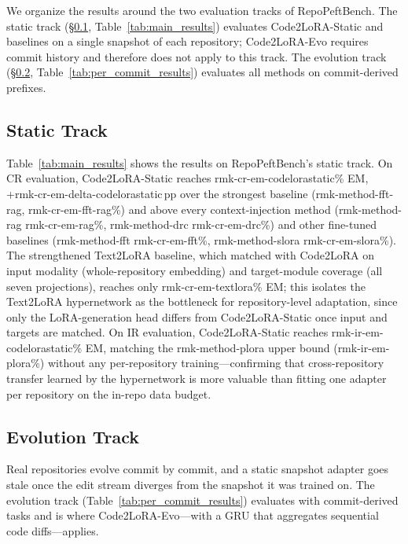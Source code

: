 \documentclass[11pt]{article}
\newcommand{\UseMacro}[1]{\csname rmk-#1\endcsname}
\newcommand{\codelora}{Code2LoRA\xspace}
\newcommand{\repopeftbench}{RepoPeftBench\xspace}
\newcommand{\codelorastatic}{\codelora-Static\xspace}
\newcommand{\codeloraevo}{\codelora-Evo\xspace}
\newcommand{\textlora}{Text2LoRA\xspace}
\begin{document}
We organize the results around the two evaluation tracks of \repopeftbench{}.
The static track (\S\ref{sec:results:static}, Table~\ref{tab:main_results}) evaluates \codelorastatic{} and baselines on a single snapshot of each repository; \codeloraevo{} requires commit history and therefore does not apply to this track.
The evolution track (\S\ref{sec:results:evolution}, Table~\ref{tab:per_commit_results}) evaluates all methods on commit-derived prefixes.

\subsection{Static Track}
\label{sec:results:static}

Table~\ref{tab:main_results} shows the results on \repopeftbench{}'s static track.
On CR evaluation, \codelorastatic{} reaches \UseMacro{cr-em-codelorastatic}\% EM, +\UseMacro{cr-em-delta-codelorastatic}\,pp over the strongest baseline (\UseMacro{method-fft-rag}, \UseMacro{cr-em-fft-rag}\%) and above every context-injection method (\UseMacro{method-rag} \UseMacro{cr-em-rag}\%, \UseMacro{method-drc} \UseMacro{cr-em-drc}\%) and other fine-tuned baselines (\UseMacro{method-fft} \UseMacro{cr-em-fft}\%, \UseMacro{method-slora} \UseMacro{cr-em-slora}\%).
The strengthened \textlora{} baseline, which matched with \codelora{} on input modality (whole-repository embedding) and target-module coverage (all seven projections), reaches only \UseMacro{cr-em-textlora}\% EM;
this isolates the \textlora{} hypernetwork as the bottleneck for repository-level adaptation, since only the LoRA-generation head differs from \codelorastatic{} once input and targets are matched.
On IR evaluation, \codelorastatic{} reaches \UseMacro{ir-em-codelorastatic}\% EM, matching the \UseMacro{method-plora} upper bound (\UseMacro{ir-em-plora}\%) without any per-repository training---confirming that cross-repository transfer learned by the hypernetwork is more valuable than fitting one adapter per repository on the in-repo data budget.

\subsection{Evolution Track}
\label{sec:results:evolution}

Real repositories evolve commit by commit, and a static snapshot adapter goes stale once the edit stream diverges from the snapshot it was trained on.
The evolution track (Table~\ref{tab:per_commit_results}) evaluates with commit-derived tasks and is where \codeloraevo{}---with a GRU that aggregates sequential code diffs---applies.
\end{document}
